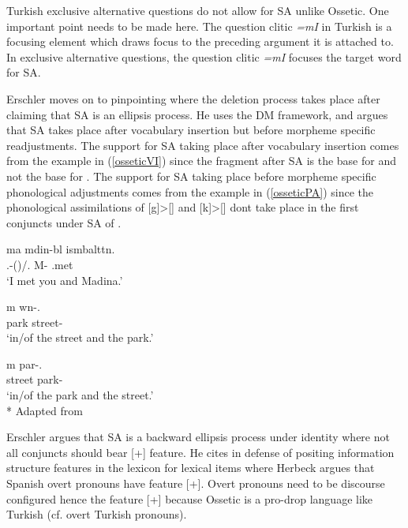 Turkish exclusive alternative questions do not allow for SA unlike Ossetic. One important point needs to be made here. The question clitic \textit{=mI} in Turkish is a focusing element which draws focus to the preceding argument it is attached to. In exclusive alternative questions, the question clitic \textit{=mI} focuses the target word for SA.

Erschler moves on to pinpointing where the deletion process takes place after claiming that SA is an ellipsis process. He uses the DM framework, and argues that SA takes place after vocabulary insertion but before morpheme specific readjustments. The support for SA taking place after vocabulary insertion comes from the example in (\ref{osseticVI}) since the fragment after SA is the base for {\Sup} and not the base for {\Nom}. The support for SA taking place before morpheme specific phonological adjustments comes from the example in (\ref{osseticPA}) since the phonological assimilations of [g]\textgreater[\textdyoghlig] and [k]\textgreater[\textteshlig] dont take place in the first conjuncts under SA of {\Obl}.

\begin{exe}
    \ex \begin{xlist}
    \ex \label{osseticVI}
     {\textturna ma} {m\textturna din\textturna-b\textturna l} {is\textturna mbaltt\textturna n}. \\ 
    {\Ssg}.{\Obl}-({\Sup})/{\Ssg}.{\Nom} {\And} M-{\Sup} {\Fsg}.met \\
    \glt `I met you and Madina.'
    
    \ex \label{osseticPA}
    \begin{xlisti}
    \ex {} {\textturna m\textturna} {w\textschwa n\textdyoghlig-\textschwa}. \\ 
    park {\And} street-{\Obl} \\
    \glt `in/of the street and the park.'
    
    \ex {} {\textturna m\textturna} {par\textteshlig-\textschwa}. \\ 
    street {\And} park-{\Obl} \\
    \glt `in/of the park and the street.'\\*
    \hfill Adapted from \citet{erschler2018suspended}
    \end{xlisti}
    \end{xlist}
\end{exe}

Erschler argues that SA is a backward ellipsis process under identity where not all conjuncts should bear \textsc{[+{\Emp}]} feature. He cites \citet{herbeck2016controlling} in defense of positing information structure features in the lexicon for lexical items where Herbeck argues that Spanish overt pronouns have feature \textsc{[+{\Foc}]}. Overt pronouns need to be discourse configured hence the feature \textsc{[+{\Emp}]} because Ossetic is a pro-drop language like Turkish (cf. \citet{ozturk2002turkish} overt Turkish pronouns). 
